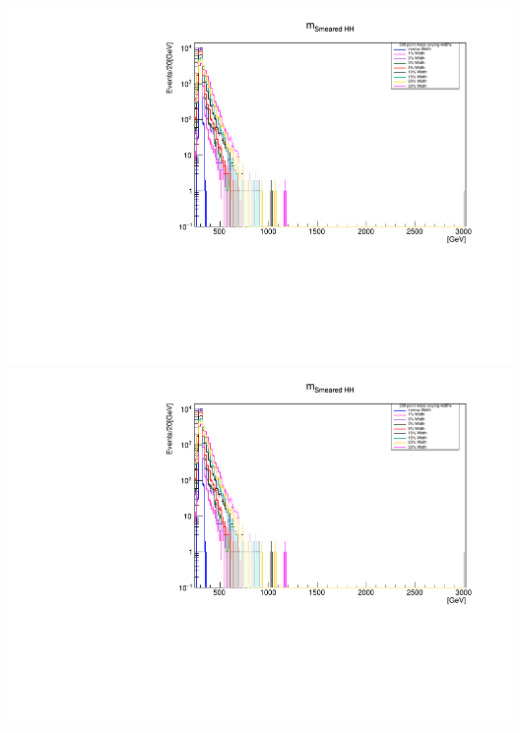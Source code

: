 \documentclass[a4wide,10pt]{article}
\begin{document}
\includegraphics[scale=0.50,page=19]{../Pdfs/Smeared_diH_InvariantMass_VaryingWidths.pdf}
\includegraphics[scale=0.50,page=20]{../Pdfs/Smeared_diH_InvariantMass_VaryingWidths.pdf}
\end{document}
